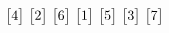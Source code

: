 \[{{\begin{bmatrix} 4\\ \end{bmatrix} \\
\begin{bmatrix} 2\\ \end{bmatrix} \\
\begin{bmatrix} 6\\ \end{bmatrix} \\
\begin{bmatrix} 1\\ \end{bmatrix} \\
\begin{bmatrix} 5\\ \end{bmatrix} \\
\begin{bmatrix} 3\\ \end{bmatrix} \\
\begin{bmatrix} 7 \end{bmatrix}
}}
\]

